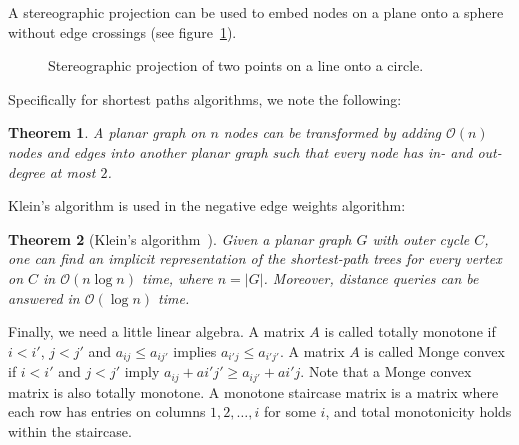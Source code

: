 \documentclass[11pt]{article}
\newtheorem{theorem}{Theorem}[section]
\begin{document}
A stereographic projection can be used to embed nodes on a plane onto a sphere without edge crossings (see figure~\ref{fig:stereo}).

\begin{figure}[!htb]
  \centering
  \caption{Stereographic projection of two points on a line onto a circle.}
  \label{fig:stereo}
\end{figure}

Specifically for shortest paths algorithms, we note the following:\\

\begin{theorem}
  A planar graph on $n$ nodes can be transformed by adding $\mathcal{O}(n)$ nodes and edges into another planar graph such that every node has in- and out-degree at most $2$.
\end{theorem}

Klein's algorithm is used in the negative edge weights algorithm:\\

\begin{theorem}[Klein's algorithm~\cite{klein2005multiple}]
Given a planar graph $G$ with outer cycle $C$, one can find an implicit representation of the shortest-path trees for every vertex on $C$ in $\mathcal{O}(n\log n)$ time, where $n=|G|$. Moreover, distance queries can be answered in $\mathcal{O}(\log n)$ time.
\end{theorem}

Finally, we need a little linear algebra. A matrix $A$ is called totally monotone if $i<i'$, $j<j'$ and $a_{ij}\leq a_{ij'}$ implies $a_{i'j}\leq a_{i'j'}$. A matrix $A$ is called Monge convex if $i<i'$ and $j<j'$ imply $a_{ij}+a{i'j'}\geq a_{ij'}+a{i'j}$. Note that a Monge convex matrix is also totally monotone. A monotone staircase matrix is a matrix where each row has entries on columns $1,2,\ldots, i$ for some $i$, and total monotonicity holds within the staircase.
\end{document}
